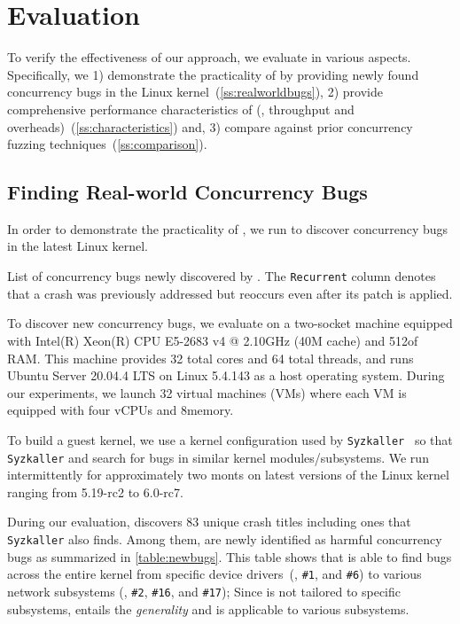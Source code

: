 \section{Evaluation}
\label{s:eval}

To verify the effectiveness of our approach, we evaluate \sys in
various aspects.
%
Specifically, we 1) demonstrate the practicality of \sys by providing
newly found concurrency bugs in the Linux
kernel~(\autoref{ss:realworldbugs}),
%
2) provide comprehensive performance characteristics of \sys (\eg,
throughput and overheads)~(\autoref{ss:characteristics}) and,
%
3) compare \sys against prior concurrency fuzzing
techniques~(\autoref{ss:comparison}).

\subsection{Finding Real-world Concurrency Bugs}
\label{ss:realworldbugs}

In order to demonstrate the practicality of \sys, we run \sys to
discover concurrency bugs in the latest Linux kernel.

\begin{table}[t]
  
  \centering
  \caption{List of concurrency bugs newly discovered by \sys. The
    \texttt{Recurrent} column denotes that a crash was previously
    addressed but reoccurs even after its patch is applied.}
  \label{table:newbugs}
\end{table}

%
To discover new concurrency bugs, we evaluate \sys on a two-socket
machine equipped with Intel(R) Xeon(R) CPU E5-2683 v4 @ 2.10GHz (40M
cache) and 512\GB of RAM.
%
This machine provides 32 total cores and 64 total threads, and runs
Ubuntu Server 20.04.4 LTS on Linux 5.4.143 as a host operating system.
%
During our experiments, we launch 32 virtual machines (VMs) where each
VM is equipped with four vCPUs and 8\GB memory.

To build a guest kernel, we use a kernel configuration used by
\texttt{Syzkaller}~\cite{syzkaller} so that \texttt{Syzkaller} and
\sys search for bugs in similar kernel modules/subsystems.
%
We run intermittently \sys for approximately two monts on latest
versions of the Linux kernel ranging from 5.19-rc2 to 6.0-rc7.


%
During our evaluation, \sys discovers 83 unique crash titles including
ones that \texttt{Syzkaller} also finds. Among them, \totalbugs are
newly identified as harmful concurrency bugs as summarized in
\autoref{table:newbugs}.
%
This table shows that \sys is able to find bugs across the entire
kernel from specific device drivers~(\eg, \texttt{\#1}, and
\texttt{\#6}) to various network subsystems (\eg, \texttt{\#2},
\texttt{\#16}, and \texttt{\#17}); Since \sys is not tailored to
specific subsystems, \sys entails the \textit{generality} and is
applicable to various subsystems.

